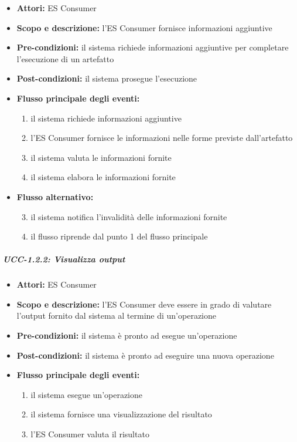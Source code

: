 \begin{itemize}
	\item \textbf{Attori:} ES Consumer
	\item \textbf{Scopo e descrizione:} l'ES Consumer fornisce informazioni aggiuntive 
	\item \textbf{Pre-condizioni:} il sistema richiede informazioni aggiuntive per completare l'esecuzione di un artefatto
	\item \textbf{Post-condizioni:} il sistema prosegue l'esecuzione
	\item \textbf{Flusso principale degli eventi:}
		\begin{enumerate}
			\item il sistema richiede informazioni aggiuntive
			\item l'ES Consumer fornisce le informazioni nelle forme previste dall'artefatto
			\item il sistema valuta le informazioni fornite
			\item il sistema elabora le informazioni fornite
		\end{enumerate}
	\item \textbf{Flusso alternativo:} 
		\begin{enumerate}
			\setcounter{enumi}{2}
			\item il sistema notifica l'invalidità delle informazioni fornite
			\item il flusso riprende dal punto 1 del flusso principale
		\end{enumerate}
\end{itemize}


\subparagraph{UCC-1.2.2: Visualizza output}

\begin{itemize}
	\item \textbf{Attori:} ES Consumer
	\item \textbf{Scopo e descrizione:} l'ES Consumer deve essere in grado di valutare l'output fornito dal sistema al termine di un'operazione
	\item \textbf{Pre-condizioni:} il sistema è pronto ad esegue un'operazione
	\item \textbf{Post-condizioni:} il sistema è pronto ad eseguire una nuova operazione
	\item \textbf{Flusso principale degli eventi:}
		\begin{enumerate}
			\item il sistema esegue un'operazione
			\item il sistema fornisce una visualizzazione del risultato
			\item l'ES Consumer valuta il risultato
		\end{enumerate}
\end{itemize}


